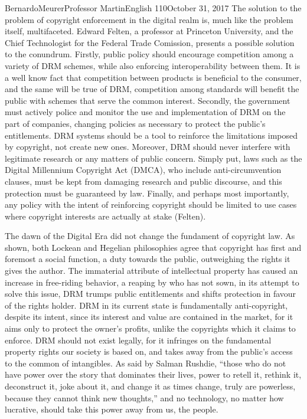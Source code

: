 \documentclass[12pt,letterpaper]{article}
\begin{document}
\begin{mla}{Bernardo}{Meurer}{Professor Martin}{English 110}{October 31, 2017}
    The solution to the problem of copyright enforcement in the digital realm is, much like the problem itself, multifaceted. Edward Felten, a professor at Princeton University, and the Chief Technologist for the Federal Trade Comission, presents a possible solution to the conundrum. Firstly, public policy should encourage competition among a variety of DRM schemes, while also enforcing interoperability between them. It is a well know fact that competition between products is beneficial to the consumer, and the same will be true of DRM, competition among standards will benefit the public with schemes that serve the common interest. Secondly, the government must actively police and monitor the use and implementation of DRM on the part of companies, changing policies as necessary to protect the public's entitlements. DRM systems should be a tool to reinforce the limitations imposed by copyright, not create new ones. Moreover, DRM should never interfere with legitimate research or any matters of public concern. Simply put, laws such as the Digital Millennium Copyright Act (DMCA), who include anti-circumvention clauses, must be kept from damaging research and public discourse, and this protection must be guaranteed by law. Finally, and perhaps most importantly, any policy with the intent of reinforcing copyright should be limited to use cases where copyright interests are actually at stake (Felten).

    The dawn of the Digital Era did not change the fundament of copyright law. As shown, both Lockean and Hegelian philosophies agree that copyright has first and foremost a social function, a duty towards the public, outweighing the rights it gives the author. The immaterial attribute of intellectual property has caused an increase in free-riding behavior, a reaping by who has not sown, in its attempt to solve this issue, DRM trumps public entitlements and shifts protection in favour of the rights holder. DRM in its current state is fundamentally anti-copyright, despite its intent, since its interest and value are contained in the market, for it aims only to protect the owner's profits, unlike the copyrights which it claims to enforce. DRM should not exist legally, for it infringes on the fundamental property rights our society is based on, and takes away from the public's access to the common of intangibles. As said by Salman Rushdie, ``those who do not have power over the story that dominates their lives, power to retell it, rethink it, deconstruct it, joke about it, and change it as times change, truly are powerless, because they cannot think new thoughts,'' and no technology, no matter how lucrative, should take this power away from us, the people.


\end{mla}
\end{document}
